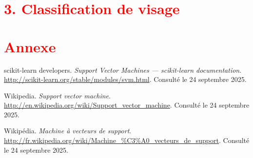 \documentclass[
  12pt,
]{article}
\begin{document}
\section{\texorpdfstring{\textcolor{red}{3. Classification de visage}}{}}\label{section-5}

\newpage

\section{\texorpdfstring{\textcolor{red}{Annexe}}{}}\label{section-6}

\begin{thebibliography}{9}

scikit-learn developers.  
\textit{Support Vector Machines — scikit-learn documentation}.  
\url{http://scikit-learn.org/stable/modules/svm.html}.  
Consulté le 24 septembre 2025.

Wikipedia.  
\textit{Support vector machine}.  
\url{http://en.wikipedia.org/wiki/Support_vector_machine}.  
Consulté le 24 septembre 2025.

Wikipédia.  
\textit{Machine à vecteurs de support}.  
\url{http://fr.wikipedia.org/wiki/Machine_%C3%A0_vecteurs_de_support}.  %
Consulté le 24 septembre 2025.

\end{thebibliography}
\end{document}
